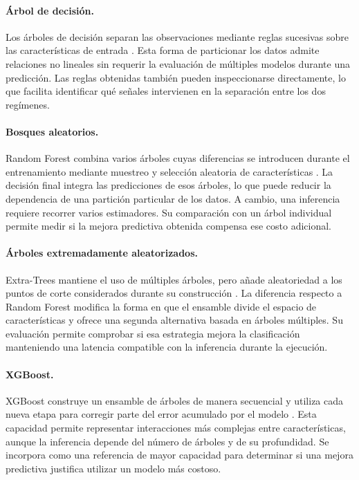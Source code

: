 \paragraph{Árbol de decisión.}

Los árboles de decisión separan las observaciones mediante reglas sucesivas
sobre las características de entrada \cite[Ch.~8]{James2021}. Esta forma de
particionar los datos admite relaciones no lineales sin requerir la evaluación
de múltiples modelos durante una predicción. Las reglas obtenidas también
pueden inspeccionarse directamente, lo que facilita identificar qué señales
intervienen en la separación entre los dos regímenes.

\paragraph{Bosques aleatorios.}

Random Forest combina varios árboles cuyas diferencias se introducen durante
el entrenamiento mediante muestreo y selección aleatoria de características
\cite{Breiman2001}. La decisión final integra las predicciones de esos árboles,
lo que puede reducir la dependencia de una partición particular de los datos.
A cambio, una inferencia requiere recorrer varios estimadores. Su comparación
con un árbol individual permite medir si la mejora predictiva obtenida
compensa ese costo adicional.

\paragraph{Árboles extremadamente aleatorizados.}

Extra-Trees mantiene el uso de múltiples árboles, pero añade aleatoriedad a los
puntos de corte considerados durante su construcción
\cite{Geurts2006}. La diferencia respecto a Random Forest modifica la forma en
que el ensamble divide el espacio de características y ofrece una segunda
alternativa basada en árboles múltiples. Su evaluación permite comprobar si
esa estrategia mejora la clasificación manteniendo una latencia compatible
con la inferencia durante la ejecución.

\paragraph{XGBoost.}

XGBoost construye un ensamble de árboles de manera secuencial y utiliza cada
nueva etapa para corregir parte del error acumulado por el modelo
\cite{Chen2016}. Esta capacidad permite representar interacciones más complejas
entre características, aunque la inferencia depende del número de árboles y de
su profundidad. Se incorpora como una referencia de mayor capacidad para
determinar si una mejora predictiva justifica utilizar un modelo más costoso.

